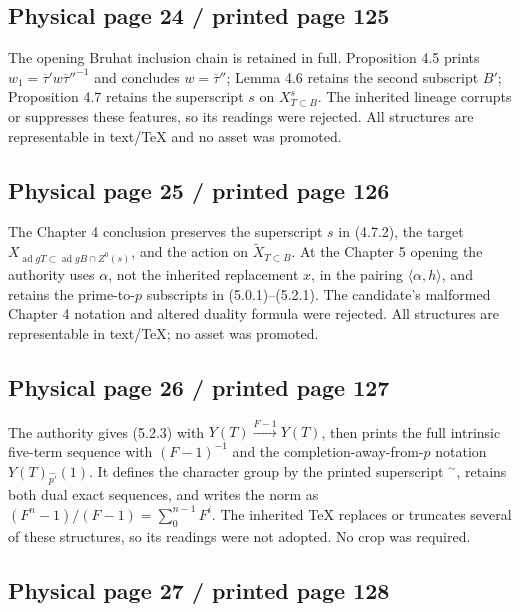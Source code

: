 \documentclass[10pt]{article}
\begin{document}
\subsection*{Physical page 24 / printed page 125}

The opening Bruhat inclusion chain is retained in full. Proposition 4.5 prints \(w_1=\overline\tau' w\overline\tau''^{-1}\) and concludes \(w=\overline\tau''\); Lemma 4.6 retains the second subscript \(B'\); Proposition 4.7 retains the superscript \(s\) on \(X_{T\subset B}^s\). The inherited lineage corrupts or suppresses these features, so its readings were rejected. All structures are representable in text/TeX and no asset was promoted.\par

\subsection*{Physical page 25 / printed page 126}

The Chapter 4 conclusion preserves the superscript \(s\) in (4.7.2), the target \(X_{\operatorname{ad}gT\subset\operatorname{ad}gB\cap Z^0(s)}\), and the action on \(\widetilde X_{T\subset B}\). At the Chapter 5 opening the authority uses \(\alpha\), not the inherited replacement \(x\), in the pairing \(\langle\alpha,h\rangle\), and retains the prime-to-\(p\) subscripts in (5.0.1)--(5.2.1). The candidate's malformed Chapter 4 notation and altered duality formula were rejected. All structures are representable in text/TeX; no asset was promoted.\par

\subsection*{Physical page 26 / printed page 127}

The authority gives (5.2.3) with \(Y(T)\xrightarrow{F-1}Y(T)\), then prints the full intrinsic five-term sequence with \((F-1)^{-1}\) and the completion-away-from-\(p\) notation \(Y(T)_{\widehat{p'}}(1)\). It defines the character group by the printed superscript \({}^{\sim}\), retains both dual exact sequences, and writes the norm as \((F^n-1)/(F-1)=\sum_0^{n-1}F^i\). The inherited TeX replaces or truncates several of these structures, so its readings were not adopted. No crop was required.\par

\subsection*{Physical page 27 / printed page 128}
\end{document}
